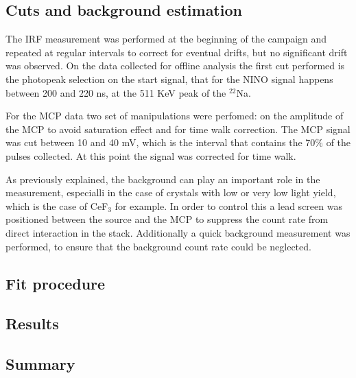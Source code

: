 \subsection{Cuts and background estimation}
The IRF measurement was performed at the beginning of the campaign and repeated at regular intervals to correct for eventual drifts, but no significant drift was observed.
On the data collected for offline analysis the first cut performed is the photopeak selection on the start signal, that for the NINO signal happens between 200 and 220 ns, at the 511 KeV peak of the $^{22}$Na.

For the MCP data two set of manipulations were perfomed: on the amplitude of the MCP to avoid saturation effect and for time walk correction. 
The MCP signal was cut between 10 and 40 mV, which is the interval that contains the 70$\%$ of the pulses collected. At this point the signal was corrected for time walk.

As previously explained, the background can play an important role in the measurement, especialli in the case of crystals with low or very low light yield, which is the case of CeF$_{3}$ for example. 
In order to control this a lead screen was positioned between the source and the MCP to suppress the count rate from direct interaction in the stack. Additionally a quick background measurement was performed, to ensure that the background count rate could be neglected.

\subsection{Fit procedure}

\subsection{Results}
\subsection{Summary}